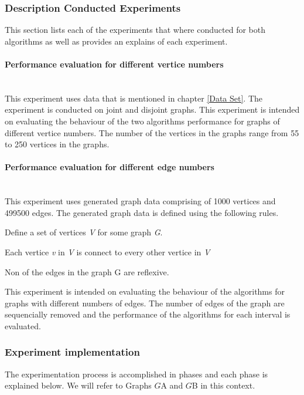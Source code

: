 \subsubsection{Description Conducted Experiments}
\label{Description Conducted Experiments}
This section lists each of the experiments that where conducted for both algorithms as well as provides an explains of each experiment.
\paragraph{Performance evaluation for different vertice numbers}\mbox{}\\
\label{Performance evaluation for different vertice numbers}
This experiment uses data that is mentioned in chapter \ref{Data Set}. The experiment is conducted on joint and disjoint graphs. This experiment is intended on evaluating the behaviour of the two algorithms performance for graphs of 
different vertice numbers. The number of the vertices in the graphs range from 55 to 250 vertices in the graphs.

\paragraph{Performance evaluation for different edge numbers}\mbox{}\\
This experiment uses generated graph data comprising of 1000 vertices and 499500 edges. The generated graph data is defined using the following rules.
\begin{myEnumerate}
  \item Define a set of vertices \textit{V} for some graph \textit{G}.
  \item Each vertice \textit{v} in \textit{V} is connect to every other vertice in \textit{V}
  \item Non of the edges in the graph G are reflexive.
\end{myEnumerate}
This experiment is intended on evaluating the behaviour of the algorithms for graphs with different numbers of edges. The number of edges of the graph are sequencially 
removed and the performance of the algorithms for each interval is evaluated.

\subsubsection{Experiment implementation}
The experimentation process is accomplished in phases and each phase is explained below. We will refer to Graphs $G${\tiny A} and $G${\tiny B} in this context.

